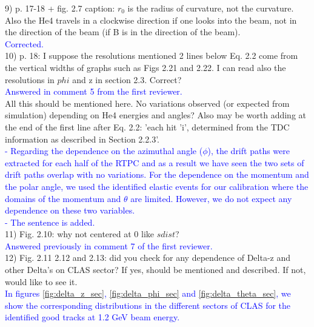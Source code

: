 9) p. 17-18 + fig. 2.7 caption: $r_{0}$ is the radius of curvature, not the curvature. 
Also the He4 travels in a clockwise direction if one looks into the beam, not 
in the direction of the beam (if B is in the direction of the beam).\\
\textcolor{blue}{  Corrected.}\\


10) p. 18: I suppose the resolutions mentioned 2 lines below Eq. 2.2 come from the 
vertical widths of graphs such as Figs 2.21 and 2.22. I can read also the 
resolutions in $phi$ and z in section 2.3. Correct?\\
 \textcolor{blue}{ Answered in comment 5 from the first reviewer.  }\\

All this should be mentioned here.  No variations observed (or expected from 
simulation) depending on He4 energies and angles? Also may be worth adding at 
the end of the first line after Eq. 2.2: 'each hit 'i', determined from the TDC 
information as described in Section 2.2.3'.\\
  \textcolor{blue}{
     - Regarding the dependence on the azimuthal 
     angle ($\phi$), the drift paths were extracted for each half of the RTPC 
     and as a result we have seen the two sets of drift paths overlap with no 
     variations. For the dependence on the momentum and the polar angle, we 
     used the identified elastic events for our calibration where the domains 
     of the momentum and $\theta$ are limited. However, we do not expect any 
     dependence on these two variables. \\
  - The sentence is added.}\\
 

11) Fig. 2.10: why not centered at 0 like $sdist$?\\
\textcolor{blue}{ Answered previously in comment 7 of the first reviewer.}\\


12) Fig. 2.11 2.12 and 2.13: did you check for any dependence of Delta-z and other 
Delta's on CLAS sector? If yes, should be mentioned and described. If not, 
would like to see it.\\
\textcolor{blue}{In figures \ref{fig:delta_z_sec}, \ref{fig:delta_phi_sec} and 
\ref{fig:delta_theta_sec}, we show the corresponding distributions in the 
different sectors of CLAS for the identified good tracks at 1.2 GeV beam 
energy.}\\

